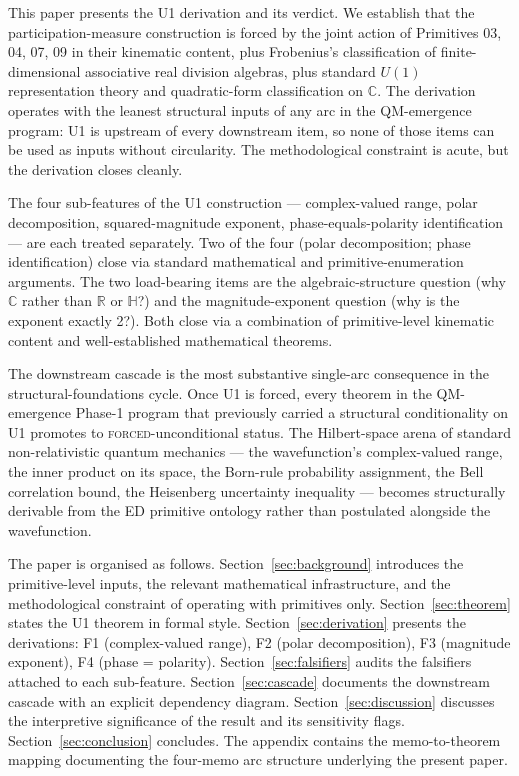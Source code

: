 \documentclass[11pt,a4paper]{article}
\begin{document}
This paper presents the U1 derivation and its verdict. We establish that the participation-measure construction is forced by the joint action of Primitives 03, 04, 07, 09 in their kinematic content, plus Frobenius's classification of finite-dimensional associative real division algebras, plus standard $U(1)$ representation theory and quadratic-form classification on $\mathbb{C}$. The derivation operates with the leanest structural inputs of any arc in the QM-emergence program: U1 is upstream of every downstream item, so none of those items can be used as inputs without circularity. The methodological constraint is acute, but the derivation closes cleanly.

The four sub-features of the U1 construction --- complex-valued range, polar decomposition, squared-magnitude exponent, phase-equals-polarity identification --- are each treated separately. Two of the four (polar decomposition; phase identification) close via standard mathematical and primitive-enumeration arguments. The two load-bearing items are the algebraic-structure question (why $\mathbb{C}$ rather than $\mathbb{R}$ or $\mathbb{H}$?) and the magnitude-exponent question (why is the exponent exactly 2?). Both close via a combination of primitive-level kinematic content and well-established mathematical theorems.

The downstream cascade is the most substantive single-arc consequence in the structural-foundations cycle. Once U1 is forced, every theorem in the QM-emergence Phase-1 program that previously carried a structural conditionality on U1 promotes to \textsc{forced}-unconditional status. The Hilbert-space arena of standard non-relativistic quantum mechanics --- the wavefunction's complex-valued range, the inner product on its space, the Born-rule probability assignment, the Bell correlation bound, the Heisenberg uncertainty inequality --- becomes structurally derivable from the ED primitive ontology rather than postulated alongside the wavefunction.

The paper is organised as follows. Section~\ref{sec:background} introduces the primitive-level inputs, the relevant mathematical infrastructure, and the methodological constraint of operating with primitives only. Section~\ref{sec:theorem} states the U1 theorem in formal style. Section~\ref{sec:derivation} presents the derivations: F1 (complex-valued range), F2 (polar decomposition), F3 (magnitude exponent), F4 (phase = polarity). Section~\ref{sec:falsifiers} audits the falsifiers attached to each sub-feature. Section~\ref{sec:cascade} documents the downstream cascade with an explicit dependency diagram. Section~\ref{sec:discussion} discusses the interpretive significance of the result and its sensitivity flags. Section~\ref{sec:conclusion} concludes. The appendix contains the memo-to-theorem mapping documenting the four-memo arc structure underlying the present paper.
\end{document}
